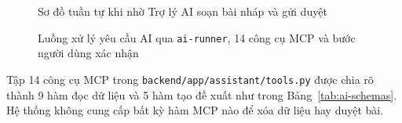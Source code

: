 \begin{figure}[!htbp]
\centering

\caption{Sơ đồ tuần tự khi nhờ Trợ lý AI soạn bài nháp và gửi duyệt}
\label{fig:auth-sequence}
\end{figure}

\begin{figure}[!htbp]
\centering

\caption{Luồng xử lý yêu cầu AI qua \texttt{ai-runner}, 14 công cụ MCP và bước người dùng xác nhận}
\label{fig:ai-pipeline}
\end{figure}

Tập 14 công cụ MCP trong \texttt{backend/app/assistant/tools.py} được chia rõ thành 9 hàm đọc dữ liệu và 5 hàm tạo đề xuất như trong Bảng~\ref{tab:ai-schemas}. Hệ thống không cung cấp bất kỳ hàm MCP nào để xóa dữ liệu hay duyệt bài.

